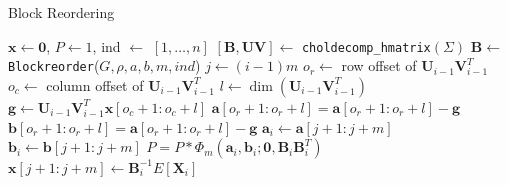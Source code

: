 \begin{frame}{Block Reordering}
\begin{algorithm}[H]
	\caption{Hierarchical-block conditioning algorithm with Block Reordering}
	\begin{algorithmic}
		\scriptsize
		\State $\mathbf{x} \leftarrow \mathbf{0}$, $P \leftarrow 1$, ind $\leftarrow$ $[1,\dots, n]$
		\State $[\mathbf{B}, \mathbf{UV}] \leftarrow$ \texttt{choldecomp\_hmatrix}$(\Sigma)$
		\State $\mathbf{B} \leftarrow$ \texttt{Blockreorder}($G, \rho, a, b, m, ind$)
		\State $j \leftarrow (i-1)m$
		\State $o_r \leftarrow$ row offset of $\mathbf{U}_{i-1}\mathbf{V}_{i-1}^T$
		\State $o_c \leftarrow$ column offset of $\mathbf{U}_{i-1}\mathbf{V}_{i-1}^T$
		\State $l \leftarrow \dim(\mathbf{U}_{i-1}\mathbf{V}_{i-1}^T)$
		\State $\mathbf{g} \leftarrow \mathbf{U}_{i-1}\mathbf{V}_{i-1}^T\mathbf{x}[o_c+1:o_c+l]$
		\State $\mathbf{a}[o_r+1:o_r+l] = \mathbf{a}[o_r+1:o_r+l] - \mathbf{g}$
		\State $\mathbf{b}[o_r+1:o_r+l] = \mathbf{a}[o_r+1:o_r+l] - \mathbf{g}$
		\EndIf
		\State $\mathbf{a}_i \leftarrow \mathbf{a}[j+1:j+m]$
		\State $\mathbf{b}_i \leftarrow \mathbf{b}[j+1:j+m]$
		\State $P = P*\Phi_m(\mathbf{a}_i, \mathbf{b}_i; \mathbf{0}, \mathbf{B}_i\mathbf{B}_i^T)$
		\State $\mathbf{x}[j+1:j+m] \leftarrow \mathbf{B}_{i}^{-1} E[\mathbf{X}_i]$
		\EndFor
		\EndProcedure
	\end{algorithmic}\label{alg:hmvn_bro}
\end{algorithm}

\end{frame}